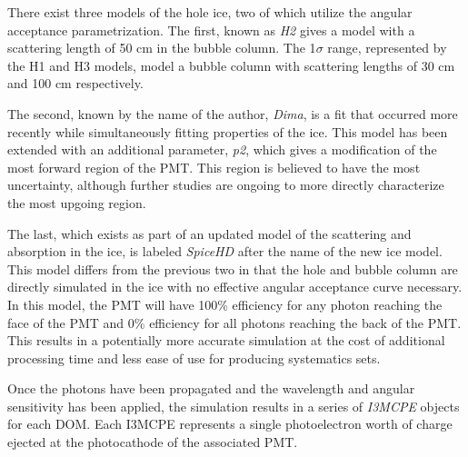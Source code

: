 There exist three models of the hole ice, two of which utilize the angular acceptance parametrization.
The first, known as \emph{H2} gives a model with a scattering length of 50 cm in the bubble column. 
The 1$\sigma$ range, represented by the H1 and H3 models, model a bubble column with scattering lengths of 30 cm and 100 cm respectively.

The second, known by the name of the author, \emph{Dima}, is a fit that occurred more recently while simultaneously fitting properties of the ice.
This model has been extended with an additional parameter, \emph{p2}, which gives a modification of the most forward region of the PMT.
This region is believed to have the most uncertainty, although further studies are ongoing to more directly characterize the most upgoing region.

The last, which exists as part of an updated model of the scattering and absorption in the ice, is labeled \emph{SpiceHD} after the name of the new ice model. 
This model differs from the previous two in that the hole and bubble column are directly simulated in the ice with no effective angular acceptance curve necessary.
In this model, the PMT will have 100\% efficiency for any photon reaching the face of the PMT and 0\% efficiency for all photons reaching the back of the PMT.
This results in a potentially more accurate simulation at the cost of additional processing time and less ease of use for producing systematics sets.

Once the photons have been propagated and the wavelength and angular sensitivity has been applied, the simulation results in a series of \emph{I3MCPE} objects for each DOM. Each I3MCPE represents a single photoelectron worth of charge ejected at the photocathode of the associated PMT. 